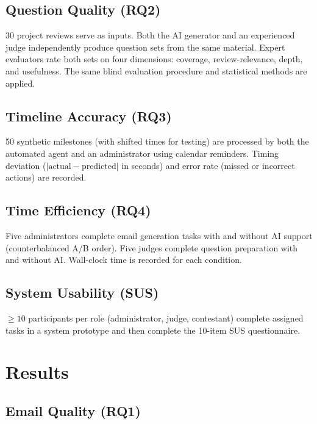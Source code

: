 \documentclass[runningheads]{llncs}
\begin{document}
\subsection{Question Quality (RQ2)}

30 project reviews serve as inputs. Both the AI generator and an experienced judge independently produce question sets from the same material. Expert evaluators rate both sets on four dimensions: coverage, review-relevance, depth, and usefulness. The same blind evaluation procedure and statistical methods are applied.

\subsection{Timeline Accuracy (RQ3)}

50 synthetic milestones (with shifted times for testing) are processed by both the automated agent and an administrator using calendar reminders. Timing deviation ($|\text{actual} - \text{predicted}|$ in seconds) and error rate (missed or incorrect actions) are recorded.

\subsection{Time Efficiency (RQ4)}

Five administrators complete email generation tasks with and without AI support (counterbalanced A/B order). Five judges complete question preparation with and without AI. Wall-clock time is recorded for each condition.

\subsection{System Usability (SUS)}

$\geq 10$ participants per role (administrator, judge, contestant) complete assigned tasks in a system prototype and then complete the 10-item SUS questionnaire.

\section{Results}

\subsection{Email Quality (RQ1)}
\end{document}
